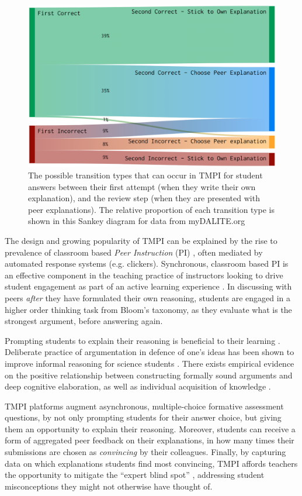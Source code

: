 \documentclass[notitlepage,12pt]{jedm}
\begin{document}
\begin{figure}[H]
	\centering
	\includegraphics[width=0.6\linewidth]{img/transitions_final.png}
	\caption{The possible transition types that can occur in TMPI for student 
	answers between their first attempt (when they write their own 
	explanation), and the review step (when they are presented with peer 
	explanations). 
	The relative proportion of each transition type is shown in this Sankey 
	diagram for data from myDALITE.org}
	\label{fig:tmpi_sankey}
\end{figure}


The design and growing popularity of TMPI can be explained by the rise to 
prevalence of classroom based \textit{Peer Instruction} (PI) 
\cite{crouch_peer_2001}, often mediated by automated response systems (e.g. 
clickers).
Synchronous, classroom based PI is an effective component in the teaching 
practice of instructors looking to drive student engagement as part of an 
active learning experience \cite{charles_beyond_2015}. 
In discussing with peers \textit{after} they have formulated their own 
reasoning, students are engaged in a higher order thinking task from Bloom's 
taxonomy, as they evaluate what is the strongest argument, before answering 
again.

Prompting students to explain their reasoning is beneficial 
to their learning \cite{chi_eliciting_1994}. 
Deliberate practice of argumentation in defence of one's ideas has been shown 
to improve informal reasoning for science students \cite{venville_impact_2010}.
There exists empirical evidence on the positive relationship between 
constructing formally sound arguments and deep cognitive elaboration, as well 
as individual acquisition of knowledge \cite{stegmann_collaborative_2012}.

TMPI platforms augment asynchronous, multiple-choice formative assessment 
questions, by not only prompting students for their answer choice, but giving 
them an opportunity to explain their reasoning.
Moreover, students can receive a form of aggregated peer feedback on their 
explanations, in how many times their submissions are chosen as 
\textit{convincing} by their colleagues.
Finally, by capturing data on which explanations students find most convincing, 
TMPI affords teachers the opportunity to mitigate the ``expert blind spot'' 
\cite{nathan_expert_2001}, addressing student misconceptions they might not 
otherwise have thought of.
\end{document}
